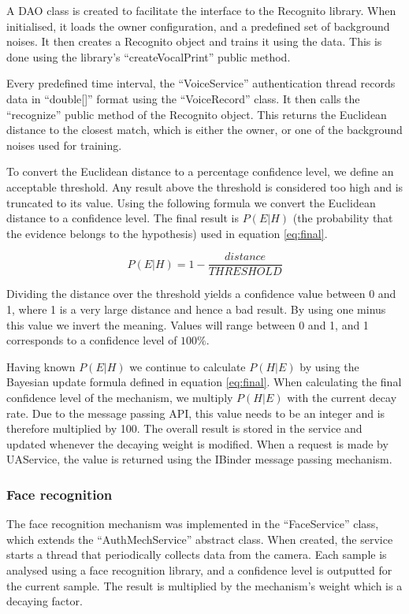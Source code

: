 A DAO class is created to facilitate the interface to the Recognito library. When initialised, it loads the owner configuration, and a predefined set of background noises. It then creates a Recognito object and trains it using the data. This is done using the library's ``createVocalPrint'' public method.

Every predefined time interval, the ``VoiceService'' authentication thread records data in ``double[]'' format using the ``VoiceRecord'' class. It then calls the ``recognize'' public method of the Recognito object. This returns the Euclidean distance to the closest match, which is either the owner, or one of the background noises used for training. 

To convert the Euclidean distance to a percentage confidence level, we define an acceptable threshold. Any result above the threshold is considered too high and is truncated to its value. Using the following formula we convert the Euclidean distance to a confidence level. The final result is $P(E|H)$ (the probability that the evidence belongs to the hypothesis) used in equation \ref{eq:final}.

$$P(E|H) = 1 - \frac{distance}{THRESHOLD}$$

Dividing the distance over the threshold yields a confidence value between 0 and 1, where 1 is a very large distance and hence a bad result. By using one minus this value we invert the meaning. Values will range between 0 and 1, and 1 corresponds to a confidence level of $100\%$. 

Having known $P(E|H)$ we continue to calculate $P(H|E)$ by using the Bayesian update formula defined in equation \ref{eq:final}. When calculating the final confidence level of the mechanism, we multiply $P(H|E)$ with the current decay rate. Due to the message passing API, this value needs to be an integer and is therefore multiplied by 100. The overall result is stored in the service and updated whenever the decaying weight is modified. When a request is made by UAService, the value is returned using the IBinder message passing mechanism.

\subsubsection{Face recognition}
\label{implface}
The face recognition mechanism was implemented in the ``FaceService'' class, which extends the ``AuthMechService'' abstract class. When created, the service starts a thread that periodically collects data from the camera. Each sample is analysed using a face recognition library, and a confidence level is outputted for the current sample. The result is multiplied by the mechanism's weight which is a decaying factor.

